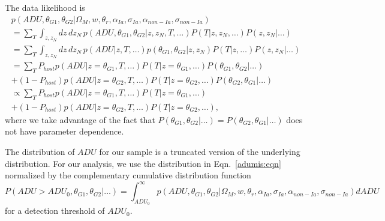 \documentclass[preprint]{aastex}
\begin{document}
The data likelihood is 
\begin{multline}
p(\mathit{ADU}, \theta_{G1}, \theta_{G2} | \Omega_M, w, \theta_r, \alpha_{Ia},\sigma_{Ia}, \alpha_{\mathit{non-Ia}},\sigma_{\mathit{non-Ia}})  \\
= \sum_{T}\int_{z,z_N} dz\,dz_N \, p(\mathit{ADU, \theta_{G1}, \theta_{G2}}| z , z_N, T, \ldots)P(T| z, z_N,\ldots) P(z, z_N|\ldots)\\
 =\sum_{T} \int_{z,z_N} dz\,dz_N\, p(\mathit{ADU}| z ,T, \ldots)p(\theta_{G1}, \theta_{G2}| z , z_N) P(T| z, \ldots) P(z, z_N|\ldots)\\
= \sum_{T} P_{host} p(\mathit{ADU}| z=\theta_{G1} ,T, \ldots) P(T| z=\theta_{G1}, \ldots) P(\theta_{G1},\theta_{G2}|\ldots) \\
 +  (1-P_{host}) p(\mathit{ADU}| z=\theta_{G2} ,T, \ldots) P(T| z=\theta_{G2}, \ldots) P(\theta_{G2},
 \theta_{G1}|\ldots)\\
\propto \sum_{T} P_{host} p(\mathit{ADU}| z=\theta_{G1} ,T, \ldots) P(T| z=\theta_{G1}, \ldots) \\
 +  (1-P_{host}) p(\mathit{ADU}| z=\theta_{G2} ,T, \ldots) P(T| z=\theta_{G2}, \ldots),
\label{adumis:eqn}
\end{multline}
where we take advantage of the fact that
$P(\theta_{G1}, \theta_{G2} | \ldots) = P(\theta_{G2}, \theta_{G1} | \ldots)$ does
not have parameter dependence.

The distribution of $\mathit{ADU}$ for our sample is a truncated version of the
underlying distribution.  
For our analysis, we use the distribution in  Eqn.~\ref{adumis:eqn} normalized by
the complementary cumulative distribution function
\begin{equation}
P(\mathit{ADU}>\mathit{ADU}_0, \theta_{G1}, \theta_{G2}|\ldots) = \int_{\mathit{ADU}_0}^{\infty} p(\mathit{ADU}, \theta_{G1}, \theta_{G2}|\Omega_M, w, \theta_r, \alpha_{Ia},\sigma_{Ia}, \alpha_{\mathit{non-Ia}},\sigma_{\mathit{non-Ia}})d\mathit{ADU}
\end{equation}
for a detection threshold of $\mathit{ADU}_0$.

\end{document}
